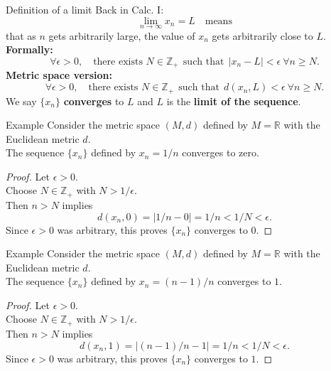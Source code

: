 \documentclass{beamer}
\begin{document}
\begin{frame}{Definition of a limit}
\pause
Back in Calc. I:
\pause
$$\lim_{n\rightarrow\infty} x_n = L\quad\text{means}$$
\pause
that as $n$ gets arbitrarily large, the value of $x_n$ gets arbitrarily close to $L$.\\
\pause
\textbf{Formally:}
\pause
$$\forall\epsilon > 0,\quad\text{there exists $N\in \mathbb{Z}_+$}\ \ \text{such that}\ \ |x_n-L| < \epsilon\ \forall n\geq N.$$
\pause
\textbf{Metric space version:}
\pause
$$\forall\epsilon > 0,\quad\text{there exists $N\in \mathbb{Z}_+$}\ \ \text{such that}\ \ d(x_n,L) < \epsilon\ \forall n\geq N.$$
\pause
We say $\{x_n\}$ \textbf{converges} to $L$ and $L$ is the \textbf{limit of the sequence}.
\end{frame}

\begin{frame}{Example}
\pause
Consider the metric space $(M,d)$ defined by $M=\mathbb{R}$ with the Euclidean metric $d$.\\
\pause
The sequence $\{x_n\}$ defined by $x_n = 1/n$ converges to zero.\\
\pause
\begin{proof}
\pause
Let $\epsilon > 0$.\\
\pause
Choose $N\in\mathbb{Z}_+$ with $N > 1/\epsilon$.\\
\pause
Then $n>N$ implies
\pause
$$d(x_n,0) = |1/n-0| = 1/n < 1/N < \epsilon.$$
\pause
Since $\epsilon > 0$ was arbitrary, this proves $\{x_n\}$ converges to $0$.
\pause
\end{proof}
\end{frame}

\begin{frame}{Example}
Consider the metric space $(M,d)$ defined by $M=\mathbb{R}$ with the Euclidean metric $d$.\\
\pause
The sequence $\{x_n\}$ defined by $x_n = (n-1)/n$ converges to $1$.\\
\pause
\begin{proof}
\pause
Let $\epsilon > 0$.\\
\pause
Choose $N\in\mathbb{Z}_+$ with $N > 1/\epsilon$.\\
\pause
Then $n>N$ implies
$$d(x_n,1) = |(n-1)/n-1| = 1/n < 1/N < \epsilon.$$
\pause
Since $\epsilon > 0$ was arbitrary, this proves $\{x_n\}$ converges to $1$.
\end{proof}
\end{frame}
\end{document}
